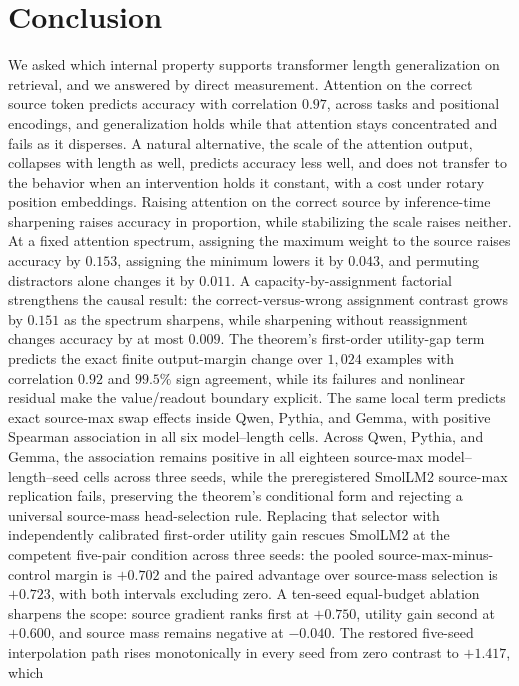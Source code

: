 \documentclass[letterpaper]{article} %
\begin{document}
\section{Conclusion}
\label{sec:conclusion}

We asked which internal property supports transformer length generalization on retrieval, and we answered
by direct measurement.
Attention on the correct source token predicts accuracy with correlation $0.97$, across tasks and
positional encodings, and generalization holds while that attention stays concentrated and fails as it
disperses.
A natural alternative, the scale of the attention output, collapses with length as well, predicts accuracy
less well, and does not transfer to the behavior when an intervention holds it constant, with a cost under
rotary position embeddings.
Raising attention on the correct source by inference-time sharpening raises accuracy in proportion, while
stabilizing the scale raises neither.
At a fixed attention spectrum, assigning the maximum weight to the source raises accuracy by $0.153$,
assigning the minimum lowers it by $0.043$, and permuting distractors alone changes it by $0.011$.
A capacity-by-assignment factorial strengthens the causal result: the correct-versus-wrong assignment
contrast grows by $0.151$ as the spectrum sharpens, while sharpening without reassignment changes accuracy
by at most $0.009$.
The theorem's first-order utility-gap term predicts the exact finite output-margin change over $1{,}024$
examples with correlation $0.92$ and $99.5\%$ sign agreement, while its failures and nonlinear residual
make the value/readout boundary explicit.
The same local term predicts exact source-max swap effects inside Qwen, Pythia, and Gemma, with positive
Spearman association in all six model--length cells.
Across Qwen, Pythia, and Gemma, the association remains positive in all eighteen source-max
model--length--seed cells across three seeds, while the preregistered SmolLM2 source-max replication fails,
preserving the theorem's conditional form and rejecting a universal source-mass head-selection rule.
Replacing that selector with independently calibrated first-order utility gain rescues SmolLM2 at the
competent five-pair condition across three seeds: the pooled source-max-minus-control margin is $+0.702$
and the paired advantage over source-mass selection is $+0.723$, with both intervals excluding zero.
A ten-seed equal-budget ablation sharpens the scope: source gradient ranks first at $+0.750$, utility gain
second at $+0.600$, and source mass remains negative at $-0.040$.
The restored five-seed interpolation path rises monotonically in every seed from zero contrast to $+1.417$, which
\end{document}
